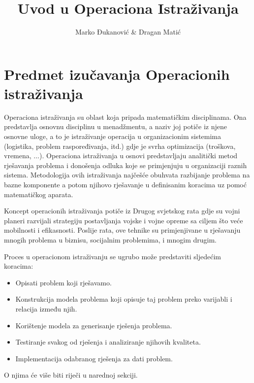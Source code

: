 \documentclass[a4paper, utf8, 11pt, colorlinks]{book}
\author{
 Marko Đukanović  \& Dragan Matić
}
\title{Uvod u Operaciona Istraživanja}
\begin{document}
\maketitle
\newpage
\tableofcontents

\newpage

\chapter{Predmet izučavanja Operacionih istraživanja}

Operaciona istraživanja su oblast koja pripada matematičkim disciplinama. Ona predstavlja osnovnu disciplinu u menadžmentu, a naziv joj potiče iz njene osnovne uloge, a to je istraživanje  operacija u organizacionim sistemima (logistika, problem raspoređivanja, itd.) gdje je svrha optimizacija (troškova, vremena, $\ldots$). Operaciona istraživanja u osnovi predstavljaju analitički metod rješavanja problema i donošenja odluka koje se primjenjuju u organizaciji raznih sistema. Metodologija ovih istraživanja  najčešće obuhvata razbijanje problema na bazne komponente a potom njihovo rješavanje u definisanim koracima uz pomoć matematičkog aparata. 

Koncept operacionih istraživanja potiče iz Drugog svjetskog rata gdje su vojni planeri razvijali strategiju postavljanja vojske i vojne opreme sa ciljem što veće mobilnosti i efikasnosti. Poslije rata, ove tehnike su primjenjivane u rješavanju mnogih problema u biznisu, socijalnim problemima, i mnogim drugim. 

Proces u operacionom istraživanju se ugrubo može predstaviti sljedećim koracima:
\begin{itemize}
    \item Opisati problem koji rješavamo.
    \item Konstrukcija modela problema koji opisuje taj problem preko varijabli i relacija između njih. 
    \item Korištenje modela za generisanje rješenja problema.
    \item Testiranje svakog od rješenja i analiziranje njihovih  kvaliteta.
    \item Implementacija odabranog rješenja za dati problem. 
\end{itemize}
O njima će više biti riječi u narednoj sekciji.
 
\end{document}
